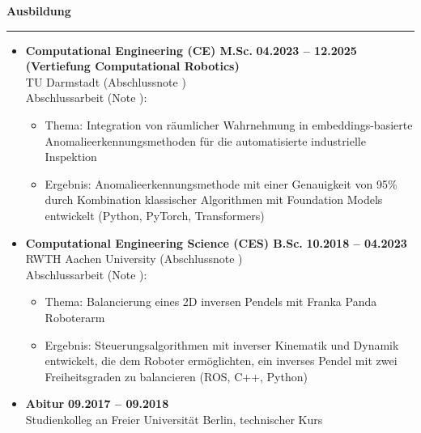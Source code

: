 \documentclass[12pt]{article} %
\newcommand{\HighlightedText}[1] {{\textbf{#1}}}
\newcommand{\PlaceAndTime}[2] {\HighlightedText{#1} \hfill \HighlightedText{#2}}
\newenvironment{ItemizeSection}[1]{
    \vspace{1mm}
    \HighlightedText{#1}
    \vspace{0.5mm}
    {\color{custom_blue} \hrule}
    \begin{itemize}[left=0.5em, topsep=0pt, itemsep=0pt, label={$\bullet$}]
}{
    \end{itemize}
}
\newenvironment{ItemizeSubsection}{
    \begin{itemize}[left=0.5em, topsep=-999pt, itemsep=0pt, label={$\circ$}]
}{
    \end{itemize}
}
\begin{document}
\vspace{-2.5mm}
\begin{ItemizeSection}{Ausbildung}
    \item \PlaceAndTime{Computational Engineering (CE) M.Sc.}{04.2023 -- 12.2025} \\
    \textbf{(Vertiefung Computational Robotics)} \\
    TU Darmstadt (Abschlussnote ) \\
    Abschlussarbeit (Note ):
    \begin{ItemizeSubsection}
        \item Thema: Integration von räumlicher Wahrnehmung in embeddings-basierte Anomalieerkennungsmethoden für die automatisierte industrielle Inspektion
        \item Ergebnis: Anomalieerkennungsmethode mit einer Genauigkeit von 95\% durch Kombination klassischer Algorithmen mit Foundation Models entwickelt (Python, PyTorch, Transformers)
    \end{ItemizeSubsection}

    \item \PlaceAndTime{Computational Engineering Science (CES) B.Sc.}{10.2018 -- 04.2023} \\
    RWTH Aachen University (Abschlussnote ) \\
    Abschlussarbeit (Note ):
    \begin{ItemizeSubsection}
        \item Thema: Balancierung eines 2D inversen Pendels mit Franka Panda Roboterarm
        \item Ergebnis: Steuerungsalgorithmen mit inverser Kinematik und Dynamik entwickelt, die dem Roboter ermöglichten, ein inverses Pendel mit zwei Freiheitsgraden zu balancieren (ROS, C++, Python)
    \end{ItemizeSubsection}

    \item \PlaceAndTime{Abitur}{09.2017 -- 09.2018} \\
     Studienkolleg an Freier Universität Berlin, technischer Kurs

\end{ItemizeSection}
\end{document}
